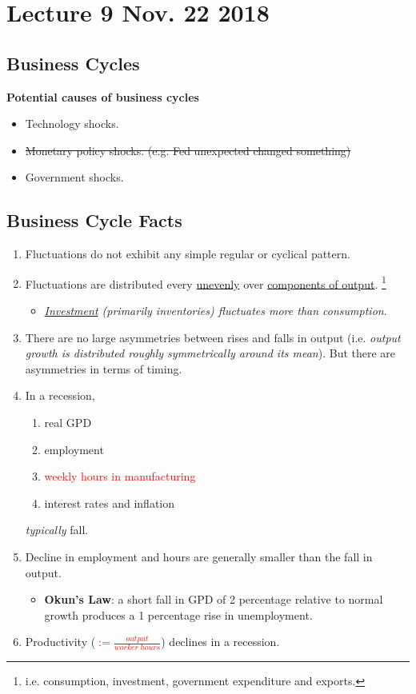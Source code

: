 \documentclass[11pt]{article}
\begin{document}
	\section{Lecture 9 Nov. 22 2018}
		\subsection*{Business Cycles}
			\par \textbf{Potential causes of business cycles}
			\begin{itemize}
				\item Technology shocks.
				\item \st{Monetary policy shocks. (e.g. Fed unexpected changed something)}
				\item Government shocks.
			\end{itemize}
		\subsection{Business Cycle Facts}
			\begin{enumerate}
				\item Fluctuations do not exhibit any simple regular or cyclical pattern.
				\item Fluctuations are distributed every \ul{unevenly} over \ul{components of output}. \footnote{i.e. consumption, investment, government expenditure and exports.} \begin{itemize}
						\item \emph{\ul{Investment} (primarily inventories) fluctuates more than consumption}.	
 						\end{itemize}
				\item There are no large asymmetries between rises and falls in output (i.e. \emph{output growth is distributed roughly symmetrically around its mean}). But there are asymmetries in terms of timing.
				\item In a recession,
					\begin{enumerate}
						\item real GPD
						\item employment
						\item \textcolor{red}{weekly hours in manufacturing}
						\item interest rates and inflation		
					\end{enumerate} \emph{typically} fall.
				\item Decline in employment and hours are generally smaller than the fall in output.
					\begin{itemize}
						\item \textbf{Okun's Law}: a short fall in GPD of 2 percentage relative to normal growth produces a 1 percentage rise in unemployment.
					\end{itemize}
				\item Productivity (\textcolor{red}{$:=\frac{output}{worker\ hours}$}) declines in a recession.
			\end{enumerate}
			
\end{document}
